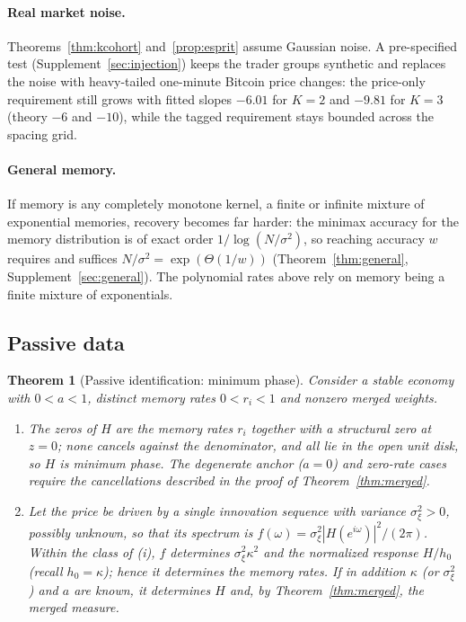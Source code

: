 \documentclass[12pt]{article}
\newtheorem{theorem}{Theorem}[section]
\theoremstyle{definition}
\theoremstyle{remark}
\begin{document}
\paragraph{Real market noise.} Theorems~\ref{thm:kcohort} and~\ref{prop:esprit} assume Gaussian noise. A pre-specified test (Supplement~\ref{sec:injection}) keeps the trader groups synthetic and replaces the noise with heavy-tailed one-minute Bitcoin price changes: the price-only requirement still grows with fitted slopes $-6.01$ for $K=2$ and $-9.81$ for $K=3$ (theory $-6$ and $-10$), while the tagged requirement stays bounded across the spacing grid.

\paragraph{General memory.} If memory is any completely monotone kernel, a finite or infinite mixture of exponential memories, recovery becomes far harder: the minimax accuracy for the memory distribution is of exact order $1/\log(N/\sigma^2)$, so reaching accuracy $w$ requires and suffices $N/\sigma^2=\exp(\Theta(1/w))$ (Theorem~\ref{thm:general}, Supplement~\ref{sec:general}). The polynomial rates above rely on memory being a finite mixture of exponentials.

\subsection{Passive data}

\begin{theorem}[Passive identification: minimum phase]\label{thm:minphase}
Consider a stable economy with $0<a<1$, distinct memory rates $0<r_i<1$ and nonzero merged weights.
\begin{enumerate}[label=(\roman*)]
\item The zeros of $H$ are the memory rates $r_i$ together with a structural zero at $z=0$; none cancels against the denominator, and all lie in the open unit disk, so $H$ is minimum phase. The degenerate anchor ($a=0$) and zero-rate cases require the cancellations described in the proof of Theorem~\ref{thm:merged}.
\item Let the price be driven by a single innovation sequence with variance $\sigma_\xi^2>0$, possibly unknown, so that its spectrum is $f(\omega)=\sigma_\xi^2|H(e^{i\omega})|^2/(2\pi)$. Within the class of (i), $f$ determines $\sigma_\xi^2\kappa^2$ and the normalized response $H/h_0$ (recall $h_0=\kappa$); hence it determines the memory rates. If in addition $\kappa$ (or $\sigma_\xi^2$) and $a$ are known, it determines $H$ and, by Theorem~\ref{thm:merged}, the merged measure.
\end{enumerate}
\end{theorem}
\end{document}
